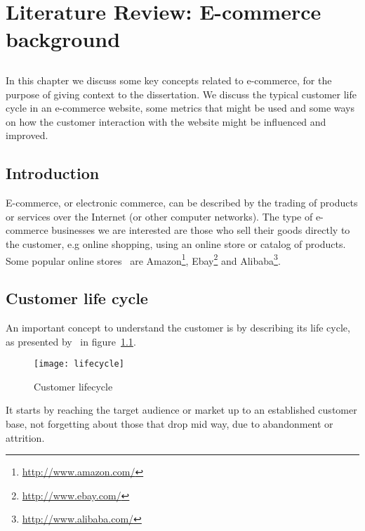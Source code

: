 \chapter{Literature Review: E-commerce background} \label{chap:ecommerce}

\section*{}

In this chapter we discuss some key concepts related to e-commerce, for the 
purpose of giving context to the dissertation. We discuss the typical customer 
life cycle in an e-commerce website, some metrics that might be used and some 
ways on how the customer interaction with the website might be influenced and 
improved.

\section{Introduction}

E-commerce, or electronic commerce, can be described by the trading of products 
or services over the Internet (or other computer networks). The type of 
e-commerce businesses we are interested are those who sell their goods directly 
to the customer, e.g online shopping, using an online store or catalog of 
products. Some popular online 
stores~\cite{alexashopping} are 
Amazon\footnote{\url{http://www.amazon.com/}}, 
Ebay\footnote{\url{http://www.ebay.com/}} and 
Alibaba\footnote{\url{http://www.alibaba.com/}}.

\section{Customer life cycle}

An important concept to understand the customer is by describing its life 
cycle, as presented by~\cite[Section 6]{Sterne2000} in 
figure~\ref{fig:lifecycle}.

\begin{figure}[h]
  \begin{center}
    \leavevmode
    \texttt{[image: lifecycle]}
    \caption{Customer lifecycle \cite{Sterne2000}}
    \label{fig:lifecycle}
  \end{center}
\end{figure}

It starts by reaching the target audience or market up to an established 
customer base, not forgetting about those that drop mid way, due to abandonment 
or attrition.

